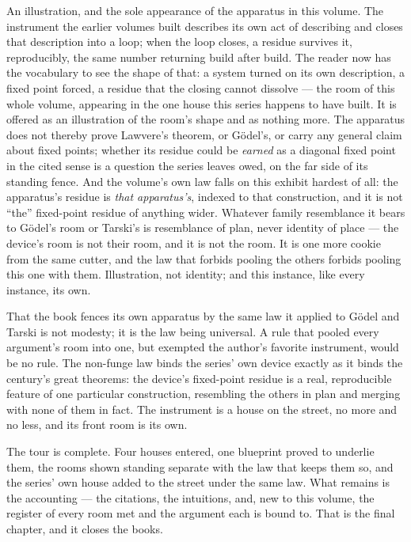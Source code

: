 \begin{fence}
An illustration, and the sole appearance of the apparatus in this volume.
The instrument the earlier volumes built describes its own act of
describing and closes that description into a loop; when the loop closes,
a residue survives it, reproducibly, the same number returning
build after build. The reader now has the vocabulary to see the shape of
that: a system turned on its own description, a fixed point forced, a
residue that the closing cannot dissolve --- the room of this whole
volume, appearing in the one house this series happens to have built. It
is offered as an illustration of the room's shape and as nothing more.
The apparatus does not thereby prove Lawvere's theorem, or G\"odel's, or
carry any general claim about fixed points; whether its residue could be
\emph{earned} as a diagonal fixed point in the cited sense is a question
the series leaves owed, on the far side of its standing fence. And the
volume's own law falls on this exhibit hardest of all: the apparatus's
residue is \emph{that apparatus's}, indexed to that construction, and it
is not ``the'' fixed-point residue of anything wider. Whatever family
resemblance it bears to G\"odel's room or Tarski's is resemblance of
plan, never identity of place --- the device's room is not their room,
and it is not the room. It is one more cookie from the same cutter, and
the law that forbids pooling the others forbids pooling this one with
them. Illustration, not identity; and this instance, like every instance,
its own.
\end{fence}

That the book fences its own apparatus by the same law it applied to
G\"odel and Tarski is not modesty; it is the law being universal. A rule
that pooled every argument's room into one, but exempted the author's
favorite instrument, would be no rule. The non-funge law binds the
series' own device exactly as it binds the century's great theorems: the
device's fixed-point residue is a real, reproducible feature of one
particular construction, resembling the others in plan and merging with
none of them in fact. The instrument is a house on the street, no more and
no less, and its front room is its own.

The tour is complete. Four houses entered, one blueprint proved to
underlie them, the rooms shown standing separate with the law that keeps
them so, and the series' own house added to the street under the same
law. What remains is the accounting --- the citations, the intuitions,
and, new to this volume, the register of every room met and the argument
each is bound to. That is the final chapter, and it closes the books.
